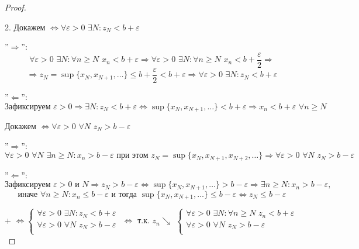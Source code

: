    \begin{proof} $ $
    
        2. Докажем  $\Leftrightarrow \forall \varepsilon > 0\,\, 
        \exists N : z_N < b + \varepsilon$
    
        ''$\Longrightarrow$'':
        \[\forall \varepsilon > 0 \,\, \exists N : \forall n \geqslant N
        \,\, x_n < b + \varepsilon \Rightarrow
        \forall \varepsilon > 0 \,\, \exists N : \forall n \geqslant N
        \,\, x_n < b + \frac{\varepsilon}{2} \Rightarrow\] \[\Rightarrow
        z_N = \sup \{x_N, x_{N + 1}, \dots\} \leqslant b + \frac{\varepsilon}{2}
        < b + \varepsilon \Rightarrow \forall \varepsilon > 0\,\, 
        \exists N : z_N < b + \varepsilon\]
    
        ''$\Longleftarrow$'':
        \[\text{Зафиксируем } \varepsilon > 0
        \Rightarrow \exists N : z_N < b + \varepsilon \Leftrightarrow
        \sup\{x_N, x_{N + 1}, \dots\} < b + \varepsilon \Rightarrow
        x_n < b + \varepsilon \,\, \forall n \geqslant N\]
    
        Докажем  $\Leftrightarrow \forall \varepsilon > 0 \,\,
        \forall N \,\, z_N > b - \varepsilon$
    
        ''$\Longrightarrow$'':
        \[\forall \varepsilon > 0 \,\, \forall N \,\, \exists n \geqslant N
        : x_n > b - \varepsilon \text{ при этом } z_N = \sup\{
        x_N, x_{N+1}, x_{N+2}, \dots\} \Rightarrow \forall
        \varepsilon > 0 \,\, \forall N \,\, z_N > b - \varepsilon\]
    
        ''$\Longleftarrow$'':
        \[\text{Зафиксируем } \varepsilon > 0 \text{ и } N \Rightarrow
        z_N > b - \varepsilon \Leftrightarrow \sup\{ x_N, x_{N+1}, \dots\}
        > b - \varepsilon \Rightarrow \exists n \geqslant N : x_n > b -
        \varepsilon,\] \[\text{иначе } \forall n \geqslant N : x_n \leqslant b -
        \varepsilon \text{ и тогда } \sup\{ x_N, x_{N+1}, \dots\} \leq
        b - \varepsilon \Leftrightarrow z_N \leqslant b - \varepsilon\]
    
         +  $\Leftrightarrow
        \begin{cases}
            \forall \varepsilon > 0\,\, 
            \exists N : z_N < b + \varepsilon\\
            \forall \varepsilon > 0 \,\,
            \forall N \,\, z_N > b - \varepsilon\\
        \end{cases}$
        $\Leftrightarrow$ т.к. $z_n \searrow$
        $\begin{cases}
            \forall \varepsilon > 0\,\, 
            \exists N : \forall n \geqslant N \,\, z_n < b + \varepsilon\\
            \forall \varepsilon > 0 \,\,
            \forall N \,\, z_N > b - \varepsilon\\
        \end{cases}$
    

\end{proof}
